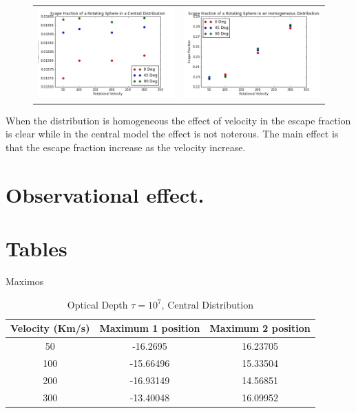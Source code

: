 \documentclass{article}
\theoremstyle{definition}
\theoremstyle{remark}
\begin{document}
\begin{figure}[H]
\begin{tabular}{cc}
    \includegraphics[width=60mm]{FECentral7.png}&

    \includegraphics[width=60mm]{FEHOM7.png}\\

  \end{tabular}

\end{figure}

When the distribution is homogeneous the effect of velocity in the
escape fraction is clear while in the central model the effect is not
noterous. 
The main effect is that the escape fraction increase as the velocity
increase.  

\section*{Observational effect.}


\section*{Tables}

Maximos\\

\begin{table}[H]
\begin{center}
\begin{tabular}{|c|c|c|}
\hline          
Velocity (Km/s) & Maximum 1 position & Maximum 2 position \\ 
\hline 
50 & -16.2695 & 16.23705 \\ 
\hline 
100 & -15.66496 & 15.33504 \\ 
\hline 
200 & -16.93149 & 14.56851 \\ 
\hline 
300 & -13.40048 & 16.09952 \\ 
\hline 
\end{tabular} 
\caption{Optical Depth $\tau= 10^{7}$, Central Distribution}
\end{center}
\end{table}
\end{document}
